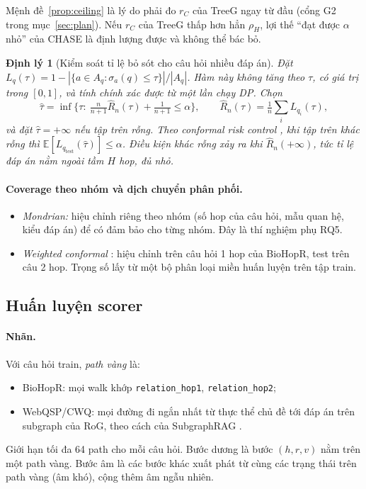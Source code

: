 \documentclass[11pt,a4paper]{article}
\newtheorem{theorem}{Định lý}
\theoremstyle{remark}
\newcommand{\E}{\mathbb{E}}
\newcommand{\Aq}{A_q}
\newcommand{\tauhat}{\hat{\tau}}
\newcommand{\method}{\textsc{CHASE}}
\begin{document}
\noindent Mệnh đề~\ref{prop:ceiling} là lý do phải đo $r_C$ của TreeG ngay từ đầu (cổng G2 trong mục~\ref{sec:plan}). Nếu $r_C$ của TreeG thấp hơn hẳn $\rho_H$, lợi thế ``đạt được $\alpha$ nhỏ'' của \method{} là định lượng được và không thể bác bỏ.

\begin{theorem}[Kiểm soát tỉ lệ bỏ sót cho câu hỏi nhiều đáp án]\label{thm:crc}
Đặt $L_q(\tau)=1-|\{a\in\Aq:\sigma_a(q)\le\tau\}|/|\Aq|$. Hàm này không tăng theo $\tau$, có giá trị trong $[0,1]$, và tính chính xác được từ một lần chạy DP. Chọn
\[
\tauhat=\inf\Big\{\tau:\ \tfrac{n}{n+1}\hat R_n(\tau)+\tfrac{1}{n+1}\le\alpha\Big\},\qquad\hat R_n(\tau)=\tfrac1n\textstyle\sum_iL_{q_i}(\tau),
\]
và đặt $\tauhat=+\infty$ nếu tập trên rỗng. Theo conformal risk control \cite{crc}, khi tập trên khác rỗng thì $\E[L_{q_{\mathrm{test}}}(\tauhat)]\le\alpha$. Điều kiện khác rỗng xảy ra khi $\hat R_n(+\infty)$, tức tỉ lệ đáp án nằm ngoài tầm $H$ hop, đủ nhỏ.
\end{theorem}

\paragraph{Coverage theo nhóm và dịch chuyển phân phối.}
\begin{itemize}[nosep]
  \item \emph{Mondrian:} hiệu chỉnh riêng theo nhóm (số hop của câu hỏi, mẫu quan hệ, kiểu đáp án) để có đảm bảo cho từng nhóm. Đây là thí nghiệm phụ RQ5.
  \item \emph{Weighted conformal} \cite{weightedcp}: hiệu chỉnh trên câu hỏi 1 hop của BioHopR, test trên câu 2 hop. Trọng số lấy từ một bộ phân loại miền huấn luyện trên tập train.
\end{itemize}

\subsection{Huấn luyện scorer}\label{sec:train}
\paragraph{Nhãn.} Với câu hỏi train, \emph{path vàng} là:
\begin{itemize}[nosep]
  \item BioHopR: mọi walk khớp \texttt{relation\_hop1}, \texttt{relation\_hop2};
  \item WebQSP/CWQ: mọi đường đi ngắn nhất từ thực thể chủ đề tới đáp án trên subgraph của RoG, theo cách của SubgraphRAG \cite{subgraphrag}.
\end{itemize}
Giới hạn tối đa 64 path cho mỗi câu hỏi. Bước dương là bước $(h,r,v)$ nằm trên một path vàng. Bước âm là các bước khác xuất phát từ cùng các trạng thái trên path vàng (âm khó), cộng thêm âm ngẫu nhiên.
\end{document}
